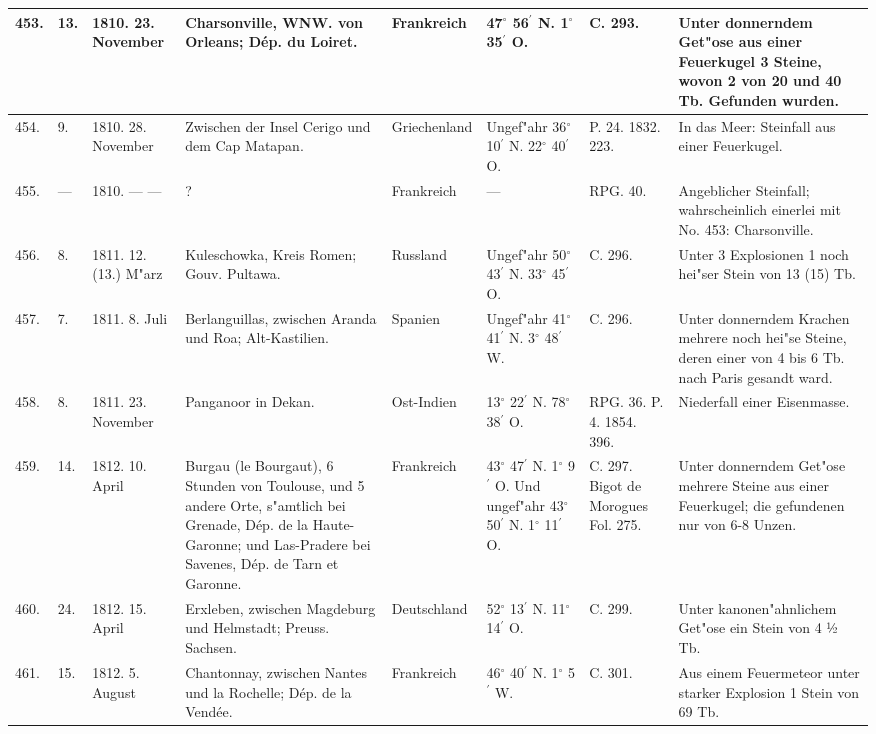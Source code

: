 \documentclass[a4paper, 8pt, oneside, polutonikogreek, german]{article}
\begin{document}
\begin{center}
\begin{longtable}{| p{4mm} | p{2mm} | p{15mm} | p{25mm} | p{16mm} | p{12mm} | p{13mm} | p{20mm} |}
        453. & 13. & 1810. 23. November & Charsonville, WNW. von Orleans; Dép. du Loiret. & Frankreich & 47$^\circ$ 56$^\prime$ N. 1$^\circ$ 35$^\prime$ O. & C. 293. & Unter donnerndem Get"ose aus einer Feuerkugel 3 Steine, wovon 2 von 20 und 40 Tb. Gefunden wurden. \\ \hline
        454. & 9. & 1810. 28. November & Zwischen der Insel Cerigo und dem Cap Matapan. & Griechenland & Ungef"ahr 36$^\circ$ 10$^\prime$ N. 22$^\circ$ 40$^\prime$ O. & P. 24. 1832. 223. & In das Meer: Steinfall aus einer Feuerkugel. \\ \hline
        455. & --- & 1810. --- --- & ? & Frankreich & --- & RPG. 40. & Angeblicher Steinfall; wahrscheinlich einerlei mit No. 453: Charsonville. \\ \hline
        456. & 8. & 1811. 12. (13.) M"arz & Kuleschowka, Kreis Romen; Gouv. Pultawa. & Russland & Ungef"ahr 50$^\circ$ 43$^\prime$ N. 33$^\circ$ 45$^\prime$ O. & C. 296. & Unter 3 Explosionen 1 noch hei"ser Stein von 13 (15) Tb. \\ \hline
        457. & 7. & 1811. 8. Juli & Berlanguillas, zwischen Aranda und Roa; Alt-Kastilien. & Spanien & Ungef"ahr 41$^\circ$ 41$^\prime$ N. 3$^\circ$ 48$^\prime$ W. & C. 296. & Unter donnerndem Krachen mehrere noch hei"se Steine, deren einer von 4 bis 6 Tb. nach Paris gesandt ward. \\ \hline
        458. & 8. & 1811. 23. November & Panganoor in Dekan. & Ost-Indien & 13$^\circ$ 22$^\prime$ N. 78$^\circ$ 38$^\prime$ O. & RPG. 36. P. 4. 1854. 396. & Niederfall einer Eisenmasse. \\ \hline
        459. & 14. & 1812. 10. April & Burgau (le Bourgaut), 6 Stunden von Toulouse, und 5 andere Orte, s"amtlich bei Grenade, Dép. de la Haute-Garonne; und Las-Pradere bei Savenes, Dép. de Tarn et Garonne. & Frankreich & 43$^\circ$ 47$^\prime$ N. 1$^\circ$ 9$^\prime$ O. Und ungef"ahr 43$^\circ$ 50$^\prime$ N. 1$^\circ$ 11$^\prime$ O. & C. 297. Bigot de Morogues Fol. 275. & Unter donnerndem Get"ose mehrere Steine aus einer Feuerkugel; die gefundenen nur von 6-8 Unzen. \\ \hline
        460. & 24. & 1812. 15. April & Erxleben, zwischen Magdeburg und Helmstadt; Preuss. Sachsen. & Deutschland & 52$^\circ$ 13$^\prime$ N. 11$^\circ$ 14$^\prime$ O. & C. 299. & Unter kanonen"ahnlichem Get"ose ein Stein von 4 ½ Tb. \\ \hline
        461. & 15. & 1812. 5. August & Chantonnay, zwischen Nantes und la Rochelle; Dép. de la Vendée. & Frankreich & 46$^\circ$ 40$^\prime$ N. 1$^\circ$ 5$^\prime$ W. & C. 301. & Aus einem Feuermeteor unter starker Explosion 1 Stein von 69 Tb. \\ \hline

\end{longtable}
\end{center}
\end{document}
